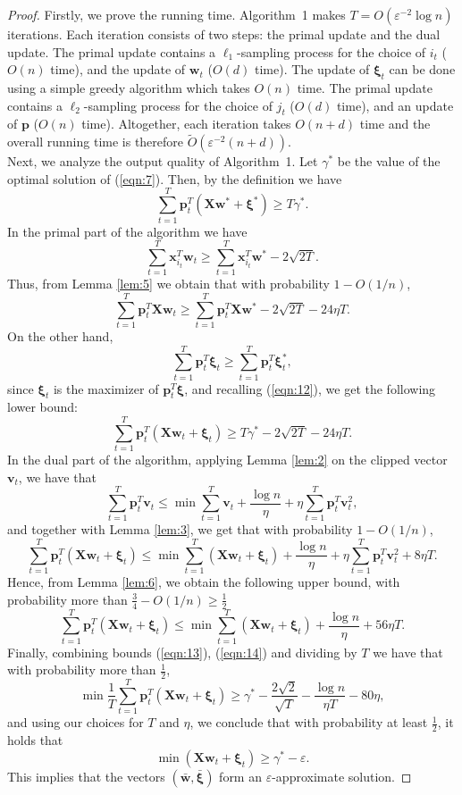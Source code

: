 \documentclass{llncs}
\newcommand{\bw}{\mathbf{w}}
\newcommand{\bp}{\mathbf{p}}
\newcommand{\bxi}{\mathbf{\xi}}
\newcommand{\sumt}{\sum_{t=1}^{T} }
\newcommand{\lc}{\left(}
\newcommand{\rc}{\right)}
\begin{document}
\begin{proof}
	
Firstly, we  prove the running time.
	Algorithm~1 makes $T=O(\varepsilon^{-2}\log n )$ iterations.
	Each iteration consists of two steps: the primal update and the dual update.
	The primal update contains a $\ell_1$-sampling process for the choice of $i_t$ ($O(n)$ time), and the update of $\bw_t$ ($O(d)$ time). The update of $\bxi_t$ can be done using a simple greedy algorithm which takes $O(n)$ time.
	The primal update contains a $\ell_2$-sampling process for the choice of $j_t$ ($O(d)$ time), and an update of $\bp$ ($O(n)$ time).
	Altogether, each iteration takes $O(n+d)$ time and the overall running time is therefore $ \tilde{O}\lc \varepsilon^{-2}\lc n+d\rc \rc $. \\
	
	Next, we analyze the output quality of Algorithm~1.
	Let $\gamma^*$ be the value of the optimal solution of (\ref{eqn:7}). Then, by the definition we have
	\begin{equation} \label{eqn:12}
	\sumt\bp_t^T \lc \mathbf{X}\bw^*+\bxi^* \rc \geq T\gamma^*.
	\end{equation}
	In the primal part of the algorithm we have
	\[
	\sumt\mathbf{x}_{i_t}^T\bw_t \geq \sumt\mathbf{x}_{i_t}^T\bw^*-2\sqrt{2T}.
	\]
	Thus, from Lemma \ref{lem:5} we obtain that with probability $1-O(1/n)$,
	\[
	\sumt\bp_t^T\mathbf{X}\bw_t \geq \sumt\bp_t^T\mathbf{X}\bw^*-2\sqrt{2T}-24\eta T.
	\]
	On the other hand,
	\[
	\sumt\bp_t^T\bxi_t \geq \sumt\bp_t^T\bxi_t^*,
	\]
	since $\bxi_t$ is the maximizer of $\bp_t^T\bxi$, and recalling (\ref{eqn:12}), we get the following lower bound:
	\begin{equation} \label{eqn:13}
	\sumt\bp_t^T \lc \mathbf{X}\bw_t+\bxi_t \rc \geq T\gamma^* -2\sqrt{2T}-24\eta T.
	\end{equation}
	In the dual part of the algorithm, applying Lemma \ref{lem:2} on the clipped vector $\mathbf{v}_t$, we have that
	\[
	\sumt\bp_t^T\mathbf{v}_t \leq \min \sumt \mathbf{v}_t+\frac{\log n}{\eta}+\eta\sumt\bp_t^T \mathbf{v}_t^2,
	\]
	and together with Lemma \ref{lem:3}, we get that with probability $1-O(1/n)$,
	\[
	\sumt\bp_t^T \lc \mathbf{X}\bw_t+\bxi_t \rc \leq \min \sumt\lc \mathbf{X}\bw_t+\bxi_t \rc+\frac{\log n}{\eta}+\eta\sumt\bp_t^T \mathbf{v}_t^2+8\eta T.
	\]
	Hence, from Lemma \ref{lem:6}, we obtain the following upper bound, with probability more than $\frac{3}{4}-O(1/n)\geq \frac{1}{2}$
	\begin{equation} \label{eqn:14}
	\sumt\bp_t^T \lc \mathbf{X}\bw_t+\bxi_t \rc \leq \min \sumt\lc \mathbf{X}\bw_t+\bxi_t \rc+\frac{\log n}{\eta}+56\eta T.
	\end{equation}
	Finally, combining bounds (\ref{eqn:13}), (\ref{eqn:14}) and dividing by $T$ we have that with probability more than $\frac{1}{2}$,
	\[
	\min \frac{1}{T} \sumt\bp_t^T \lc \mathbf{X}\bw_t+\bxi_t \rc \geq \gamma^*-\frac{2\sqrt{2}}{\sqrt{T}}-\frac{\log n}{\eta T}-80\eta,
	\]
	and using our choices for $T$ and $\eta$, we conclude that with probability at least $\frac{1}{2}$, it holds that
	\[
	\min \lc \mathbf{X}\bw_t+\bxi_t \rc \geq \gamma^* -\varepsilon.
	\]
	This implies that the vectors $(\bar{\bw},\bar{\bxi})$ form an $\varepsilon$-approximate solution.

\end{proof}
\begin{small}


\end{small}
\end{document}
